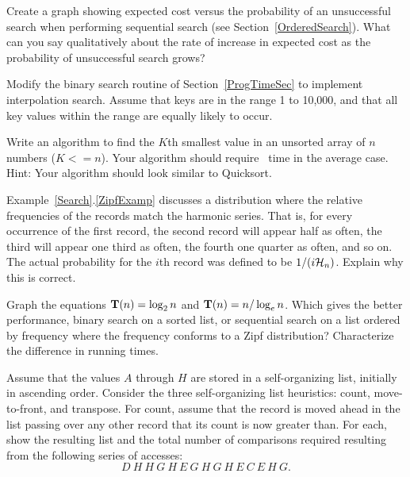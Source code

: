 \begin{exercises}

\item
Create a graph showing expected cost versus the probability of
an unsuccessful search when performing sequential search
(see Section~\ref{OrderedSearch}).
What can you say qualitatively about the rate of increase in expected
cost as the probability of unsuccessful search grows?

\item
Modify the binary search routine of
Section~\ref{ProgTimeSec} to implement interpolation
search.
Assume that keys are in the range 1 to 10,000, and that all key values
within the range are equally likely to occur.

\item
Write an algorithm to find the \(K\)th
smallest value in an unsorted array of \(n\) numbers (\(K <= n\)).
Your algorithm should require \Thetan\ time in the average case.
Hint: Your algorithm should look similar to
Quicksort.

\item
\label{ZipfExer}
Example~\ref{Search}.\ref{ZipfExamp} discusses a distribution where
the relative frequencies of the records match the harmonic series.
That is, for every occurrence of the first record, the second record
will appear half as often, the third will appear one third as often,
the fourth one quarter as often, and so on.
The actual probability for the \(i\)th record was defined to be
\(1/(i\mbox{${\cal H}_n$})\).
Explain why this is correct.

\item
Graph the equations \(\mbox{$\textbf{T}(n)$} = \log_2 n\) and \(\mbox{$\textbf{T}(n)$} = n/\log_e n\).
Which gives the better performance, binary search
on a sorted list,
or sequential search on a list ordered by
frequency where the frequency conforms to a Zipf
distribution?
Characterize the difference in running times.

\item
Assume that the values \(A\) through \(H\) are stored in a self-organizing
list,
initially in ascending order.
Consider the three self-organizing list heuristics: count,
move-to-front, and transpose.
For count, assume that the record is moved ahead in the list passing
over any other record that its count is now greater than.
For each, show the resulting list and the total number of
comparisons required resulting from the following series of accesses:
\[ D~H~H~G~H~E~G~H~G~H~E~C~E~H~G. \]


\end{exercises}
